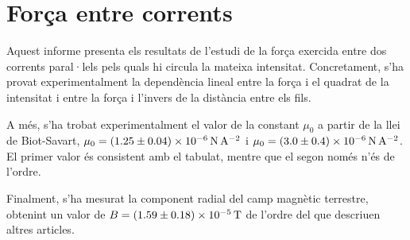 \chapter{Força entre corrents}
\begin{resum}
	Aquest informe presenta els resultats de l'estudi de la força exercida entre dos corrents paral·lels pels quals hi circula la mateixa intensitat. Concretament, s'ha provat experimentalment la dependència lineal entre la força i el quadrat de la intensitat i entre la força i l'invers de la distància entre els fils.

	A més, s'ha trobat experimentalment el valor de la constant \( \mu_0 \) a partir de la llei de Biot-Savart, \( \mu_0 = \data{1.25}{0.04e-6}{N.A^{-2}} \) i \( \mu_0 = \data{3.0}{0.4d-6}{N.A^{-2}} \). El primer valor és consistent amb el tabulat, mentre que el segon només n'és de l'ordre. 

	Finalment, s'ha mesurat la component radial del camp magnètic terrestre, obtenint un valor de \( B = \data{1.59}{0.18d-5}{T} \) de l'ordre del que descriuen altres articles.
\end{resum}


